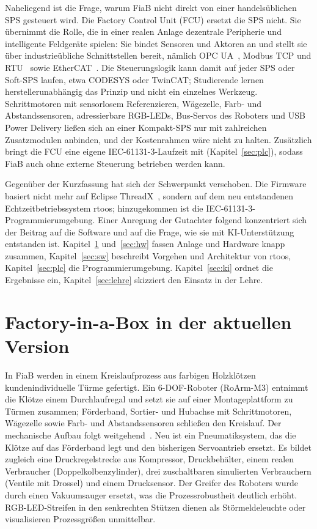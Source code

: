 \documentclass[]{article}
\begin{document}
Naheliegend ist die Frage, warum FiaB nicht direkt von einer handelsüblichen SPS gesteuert wird. Die Factory Control Unit (FCU) ersetzt die SPS nicht. Sie übernimmt die Rolle, die in einer realen Anlage dezentrale Peripherie und intelligente Feldgeräte spielen: Sie bindet Sensoren und Aktoren an und stellt sie über industrieübliche Schnittstellen bereit, nämlich OPC UA~\cite{iec62541}, Modbus TCP und RTU~\cite{modbus} sowie EtherCAT~\cite{ethercat}. Die Steuerungslogik kann damit auf jeder SPS oder Soft-SPS laufen, etwa CODESYS oder TwinCAT; Studierende lernen herstellerunabhängig das Prinzip und nicht ein einzelnes Werkzeug. Schrittmotoren mit sensorlosem Referenzieren, Wägezelle, Farb- und Abstandssensoren, adressierbare RGB-LEDs, Bus-Servos des Roboters und USB Power Delivery ließen sich an einer Kompakt-SPS nur mit zahlreichen Zusatzmodulen anbinden, und der Kostenrahmen wäre nicht zu halten. Zusätzlich bringt die FCU eine eigene IEC-61131-3-Laufzeit mit (Kapitel~\ref{sec:plc}), sodass FiaB auch ohne externe Steuerung betrieben werden kann.

Gegenüber der Kurzfassung hat sich der Schwerpunkt verschoben. Die Firmware basiert nicht mehr auf Eclipse ThreadX~\cite{threadx}, sondern auf dem neu entstandenen Echtzeitbetriebssystem rtoos; hinzugekommen ist die IEC-61131-3-Programmierumgebung. Einer Anregung der Gutachter folgend konzentriert sich der Beitrag auf die Software und auf die Frage, wie sie mit KI-Unterstützung entstanden ist. Kapitel~\ref{sec:fiab} und~\ref{sec:hw} fassen Anlage und Hardware knapp zusammen, Kapitel~\ref{sec:sw} beschreibt Vorgehen und Architektur von rtoos, Kapitel~\ref{sec:plc} die Programmierumgebung. Kapitel~\ref{sec:ki} ordnet die Ergebnisse ein, Kapitel~\ref{sec:lehre} skizziert den Einsatz in der Lehre.

\section{Factory-in-a-Box in der aktuellen Version}\label{sec:fiab}

In FiaB werden in einem Kreislaufprozess aus farbigen Holzklötzen kundenindividuelle Türme gefertigt. Ein 6-DOF-Roboter (RoArm-M3) entnimmt die Klötze einem Durchlaufregal und setzt sie auf einer Montageplattform zu Türmen zusammen; Förderband, Sortier- und Hubachse mit Schrittmotoren, Wägezelle sowie Farb- und Abstandssensoren schließen den Kreislauf. Der mechanische Aufbau folgt weitgehend~\cite{liebler2025}. Neu ist ein Pneumatiksystem, das die Klötze auf das Förderband legt und den bisherigen Servoantrieb ersetzt. Es bildet zugleich eine Druckregelstrecke aus Kompressor, Druckbehälter, einem realen Verbraucher (Doppelkolbenzylinder), drei zuschaltbaren simulierten Verbrauchern (Ventile mit Drossel) und einem Drucksensor. Der Greifer des Roboters wurde durch einen Vakuumsauger ersetzt, was die Prozessrobustheit deutlich erhöht. RGB-LED-Streifen in den senkrechten Stützen dienen als Störmeldeleuchte oder visualisieren Prozessgrößen unmittelbar.
\end{document}
